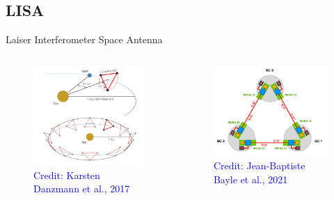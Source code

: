 \documentclass[pdf]{beamer}
\newcommand{\credit}[1]{\tiny{\textcolor{blue}{Credit: #1}}}
\begin{document}
\subsection{LISA}
\begin{frame}{Laiser Interferometer Space Antenna}
\begin{columns}

\begin{figure}
\includegraphics[scale=.15]{fig/LISA.png}
\caption*{\credit{Karsten Danzmann et al., 2017}}
\end{figure}

\begin{figure}
\includegraphics[scale=.12]{fig/LISAsch.png}
\caption*{\credit{Jean-Baptiste Bayle et al., 2021}}
\end{figure}

\end{columns}
\end{frame}
\end{document}
